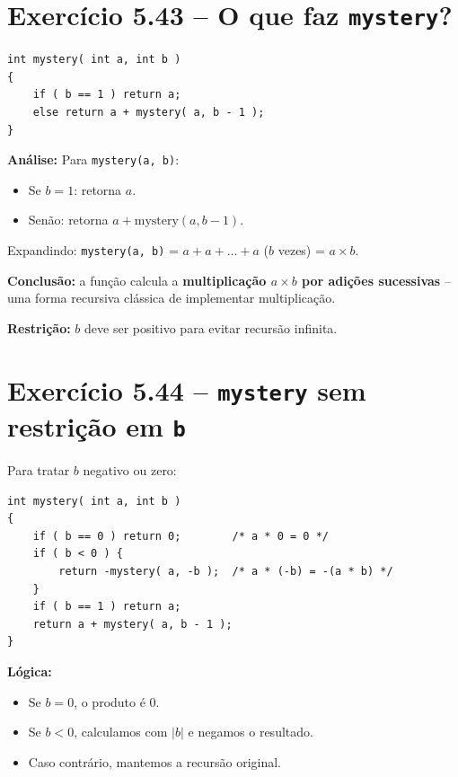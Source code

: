 \documentclass[12pt,a4paper]{article}
\begin{document}
\section{Exercício 5.43 -- O que faz \texttt{mystery}?}

\begin{respostabox}
\begin{lstlisting}
int mystery( int a, int b )
{
    if ( b == 1 ) return a;
    else return a + mystery( a, b - 1 );
}
\end{lstlisting}

\textbf{Análise:} Para \texttt{mystery(a, b)}:
\begin{itemize}[noitemsep]
  \item Se $b = 1$: retorna $a$.
  \item Senão: retorna $a + \text{mystery}(a, b-1)$.
\end{itemize}

Expandindo: \texttt{mystery(a, b)} = $a + a + \ldots + a$ ($b$ vezes) = $a \times b$.

\textbf{Conclusão:} a função calcula a \textbf{multiplicação $a \times b$ por adições
sucessivas} -- uma forma recursiva clássica de implementar multiplicação.

\textbf{Restrição:} $b$ deve ser positivo para evitar recursão infinita.
\end{respostabox}

\section{Exercício 5.44 -- \texttt{mystery} sem restrição em \texttt{b}}

\begin{respostabox}
Para tratar $b$ negativo ou zero:

\begin{lstlisting}
int mystery( int a, int b )
{
    if ( b == 0 ) return 0;        /* a * 0 = 0 */
    if ( b < 0 ) {
        return -mystery( a, -b );  /* a * (-b) = -(a * b) */
    }
    if ( b == 1 ) return a;
    return a + mystery( a, b - 1 );
}
\end{lstlisting}

\textbf{Lógica:}
\begin{itemize}[noitemsep]
  \item Se $b = 0$, o produto é 0.
  \item Se $b < 0$, calculamos com $|b|$ e negamos o resultado.
  \item Caso contrário, mantemos a recursão original.
\end{itemize}
\end{respostabox}
\end{document}
